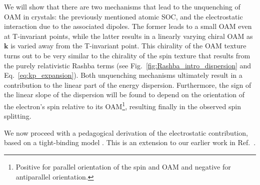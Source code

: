 We will show that there are two mechanisms that lead to the unquenching of \gls{OAM} in crystals: the previously mentioned atomic \gls{SOC}, and the electrostatic interaction due to the associated dipoles.
The former leads to a small \gls{OAM} even at \gls{T}-invariant points, while the latter results in a linearly varying chiral \gls{OAM} as $\bm k$ is varied away from the \gls{T}-invariant point.
This chirality of the \gls{OAM} texture turns out to be very similar to the chirality of the spin texture that results from the purely relativistic Rashba terms (see Fig.~\ref{fig:Rashba_intro_dispersion} and Eq.~\eqref{eq:kp_expansion}).
Both unquenching mechanisms ultimately result in a contribution to the linear part of the energy dispersion.
Furthermore, the sign of the linear slope of the dispersion will be found to depend on the orientation of the electron's spin relative to its \gls{OAM}\footnote{Positive for parallel orientation of the spin and \gls{OAM} and negative for antiparallel orientation.}, resulting finally in the observed spin splitting.
    
We now proceed with a pedagogical derivation of the electrostatic contribution, based on a tight-binding model \cite{Bloch1929,Slater1954,Petersen2000,Kim2014,Go2016}. This is an extension to our earlier work in Ref.~\cite{Ponet2018}.

